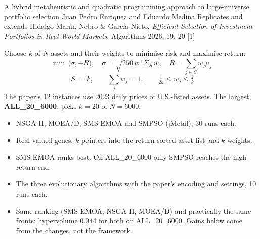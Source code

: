 


\color{ink}
  {A hybrid metaheuristic and quadratic programming approach to large-universe portfolio selection}
  {Juan Pedro Enriquez and Eduardo Medina}
  {Replicates and extends Hidalgo-Marín, Nebro \& García-Nieto, \emph{Efficient Selection of Investment Portfolios
  in Real-World Markets}, Algorithms 2026, 19, 20 [1]}

\hspace*{24mm}%
\begin{minipage}[t]{\colw}\body
  Choose $k$ of $N$ assets and their weights to minimise risk and maximise return:
  \[
    \min\,\bigl(\sigma,-R\bigr),\quad \sigma=\sqrt{250\,w^{\top}\Sigma_S\,w},\quad R=\textstyle\sum_{j\in S} w_j\mu_j
  \]
  \[
    |S|=k,\qquad \textstyle\sum_j w_j=1,\qquad \tfrac{1}{2k}\le w_j\le\tfrac{2}{k}
  \]
  The paper's 12 instances use 2023 daily prices of U.S.-listed assets. The largest, \textbf{ALL\_20\_6000},
  picks $k=20$ of $N=6000$.

  \vspace{9mm}
  \begin{itemize}
    \item NSGA-II, MOEA/D, SMS-EMOA and SMPSO (jMetal), 30 runs each.
    \item Real-valued genes: $k$ pointers into the return-sorted asset list and $k$ weights.
    \item SMS-EMOA ranks best. On ALL\_20\_6000 only SMPSO reaches the high-return end.
  \end{itemize}

  \vspace{9mm}
  \begin{itemize}
    \item The three evolutionary algorithms with the paper's encoding and settings, 10 runs each.
    \item Same ranking (SMS-EMOA, NSGA-II, MOEA/D) and practically the same fronts: hypervolume 0.944 for both
    on ALL\_20\_6000. Gains below come from the changes, not the framework.
  \end{itemize}
\end{minipage}%
\hspace{\gap}%
